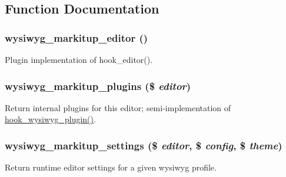 \subsection{Function Documentation}
\hypertarget{markitup_8inc_a0df072123c61c0478ecbb5da680d639a}{
\subsubsection[{wysiwyg\_\-markitup\_\-editor}]{\setlength{\rightskip}{0pt plus 5cm}wysiwyg\_\-markitup\_\-editor ()}}
\label{markitup_8inc_a0df072123c61c0478ecbb5da680d639a}
Plugin implementation of hook\_\-editor(). \hypertarget{markitup_8inc_aa80650467ba21eddceb4a487843d92a9}{
\subsubsection[{wysiwyg\_\-markitup\_\-plugins}]{\setlength{\rightskip}{0pt plus 5cm}wysiwyg\_\-markitup\_\-plugins (\$ {\em editor})}}
\label{markitup_8inc_aa80650467ba21eddceb4a487843d92a9}
Return internal plugins for this editor; semi-\/implementation of \hyperlink{wysiwyg_8api_8php_abad2b35b32be0b20d73006b73205045c}{hook\_\-wysiwyg\_\-plugin()}. \hypertarget{markitup_8inc_a29b61f58bf5058571e17120a6f582769}{
\subsubsection[{wysiwyg\_\-markitup\_\-settings}]{\setlength{\rightskip}{0pt plus 5cm}wysiwyg\_\-markitup\_\-settings (\$ {\em editor}, \/  \$ {\em config}, \/  \$ {\em theme})}}
\label{markitup_8inc_a29b61f58bf5058571e17120a6f582769}
Return runtime editor settings for a given wysiwyg profile.


